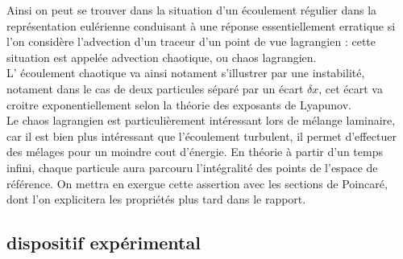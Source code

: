\documentclass[a4paper,12pt,titlepage]{report}
\begin{document}
\begin{onehalfspace}
Ainsi on peut se trouver dans la situation d'un écoulement régulier dans la représentation eulérienne conduisant à une réponse essentiellement erratique si l'on considère l'advection d'un traceur d'un point de vue lagrangien : cette situation est appelée advection chaotique, ou chaos lagrangien.\\
L' écoulement chaotique va ainsi notament s'illustrer par une instabilité, notament dans le cas de deux particules séparé par un écart $\delta x$, cet écart va croitre exponentiellement selon la théorie des exposants de Lyapunov. 
\\
Le chaos lagrangien est particulièrement intéressant lors de mélange laminaire, car il est bien plus intéressant que l'écoulement turbulent, il permet d'effectuer des mélages pour un moindre cout d'énergie. En théorie à partir d'un temps infini, chaque particule aura parcouru l'intégralité des points de l'espace de référence.  On mettra en exergue cette assertion avec les sections de Poincaré, dont l'on explicitera les propriétés plus tard dans le rapport. 

\subsection{dispositif expérimental} 


\end{onehalfspace}
\end{document}
